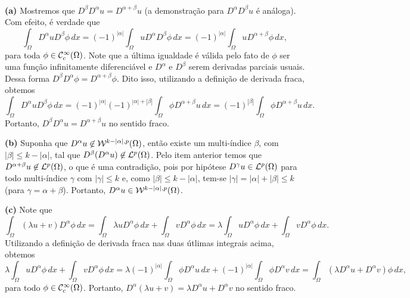 \begin{prf}
    ~

    \textbf{(a)} Mostremos que $D^{\beta}D^{\alpha} u = D^{\alpha + \beta}u$ (a demonstração para $D^{\alpha}D^{\beta} u$ é análoga).
    Com efeito, é verdade que
    \[
        \int_\Omega D^{\alpha} u D^{\beta} \phi \, dx = (-1)^{|\alpha|} \int_\Omega u D^{\alpha} D^{\beta} \phi \, dx = (-1)^{|\alpha|} \int_\Omega u D^{\alpha + \beta} \phi \,dx,
    \]
    para toda $\phi \in \mathcal{C}^{\infty}_c(\Omega)$. Note que a última igualdade é válida pelo fato de $\phi$ ser uma função infinitamente diferenciável e $D^\alpha$ e $D^\beta$ serem derivadas parciais usuais.
    Dessa forma $D^{\beta}D^{\alpha} \phi = D^{\alpha + \beta} \phi$.
    Dito isso, utilizando a definição de derivada fraca, obtemos
    \[
        \int_\Omega D^{\alpha} u D^{\beta} \phi \, dx = (-1)^{|\alpha|}(-1)^{|\alpha| + |\beta|} \int_\Omega \phi D^{\alpha+\beta} u \,dx = (-1)^{|\beta|} \int_\Omega \phi D^{\alpha + \beta} u \,dx.
    \]
    Portanto, $D^{\beta} D^{\alpha} u = D^{\alpha + \beta} u$ no sentido fraco.

    \textbf{(b)} Suponha que $D^\alpha u \not\in \mathcal{W}^{k-|\alpha|,p}(\Omega)$, então existe um multi-índice $\beta$, com $|\beta| \leqslant k - |\alpha|$, tal que $D^{\beta}(D^{\alpha}u) \not\in \mathcal{L}^p(\Omega)$.
    Pelo item anterior temos que $D^{\alpha+\beta}u \not\in \mathcal{L}^p(\Omega)$, o que é uma contradição, pois por hipótese $D^{\gamma}u \in \mathcal{L}^p(\Omega)$ para todo multi-índice $\gamma$ com $|\gamma| \leqslant k$ e, como $|\beta| \leqslant k - |\alpha|$, tem-se $|\gamma| = |\alpha| + |\beta| \leqslant k$ (para $\gamma = \alpha + \beta$).
    Portanto, $D^{\alpha}u \in \mathcal{W}^{k-|\alpha|,p}(\Omega)$.

    \textbf{(c)} Note que
    \[
        \int_\Omega (\lambda u + v) D^{\alpha}\phi \,dx = \int_\Omega \lambda u D^\alpha \phi \, dx + \int_\Omega v D^\alpha \phi \, dx = \lambda \int_\Omega u D^{\alpha} \phi \,dx + \int_\Omega v D^{\alpha} \phi \, dx.
    \]
    Utilizando a definição de derivada fraca nas duas útlimas integrais acima, obtemos
    {\small
    \[
        \lambda \int_\Omega u D^{\alpha} \phi \,dx + \int_\Omega v D^{\alpha} \phi \, dx = \lambda (-1)^{|\alpha|} \int_\Omega \phi D^{\alpha} u \, dx + (-1)^{|\alpha|}\int_\Omega \phi D^{\alpha} v \, dx = \int_\Omega (\lambda D^{\alpha}u + D^{\alpha}v )\phi \,dx,
    \]}\!
    para todo $\phi \in \mathcal{C}^{\infty}_c(\Omega)$. Portanto, $D^{\alpha}(\lambda u + v) = \lambda D^\alpha u + D^\alpha v$ no sentido fraco.


\end{prf}
